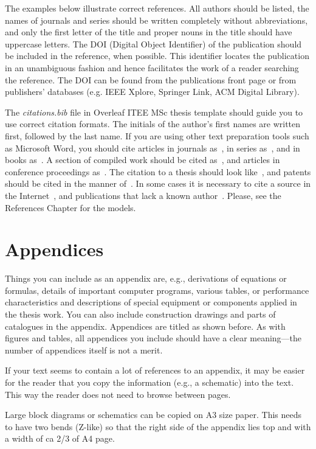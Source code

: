 The examples below illustrate correct references. All authors should be
listed, the names of journals and series should be written completely
without abbreviations, and only the first letter of the title and
proper nouns in the title should have uppercase letters. The DOI
(Digital Object Identifier) of the publication should be included in
the reference, when possible. This identifier locates the publication
in an unambiguous fashion and hence facilitates the work of a reader
searching the reference. The DOI can be found from the publications
front page or from publishers’ databases (e.g. IEEE Xplore, Springer
Link, ACM Digital Library).

The \textit{citations.bib} file in Overleaf ITEE MSc thesis template should guide you to use correct citation formats. The initials of the author's first names are written first, followed by the last name. If you are using other text preparation tools such as Microsoft Word, you should cite articles in journals  as~\cite{ojala:2002}, in series as~\cite{riekki:1998}, and in books as~\cite[p. 55]{pietikainen:2011}. A section of compiled work should be cited as~\cite{cvejic:2005}, and articles in conference proceedings as~\cite{heikkila:1997}. The citation to a thesis should look like~\cite{heikkinen:2011}, and patents should be cited in the manner of~\cite{toivonen:2004}. In some cases it is necessary to cite a source in the Internet~\cite{korpela}, and publications that lack a known author~\cite{asuntoliitto_asumistaso_1969}. Please, see the References Chapter for the models.

\section{Appendices}
\label{sec:appendices}
Things you can include as an appendix are, e.g., derivations of equations or formulas, details of important computer programs, various tables, or performance characteristics and descriptions of special equipment or components applied in the thesis work. You can also include construction drawings and parts of catalogues in the appendix. Appendices are titled as shown before. As with figures and tables, all appendices you include should have a clear meaning---the number of appendices itself is not a merit.

If your text seems to contain a lot of references to an appendix, it may be easier for the reader that you copy the information (e.g., a schematic) into the text. This way the reader does not need to browse between pages.

Large block diagrams or schematics can be copied on A3 size paper. This needs to have two bends (Z-like) so that the right side of the appendix lies top and with a width of ca 2/3 of A4 page.
